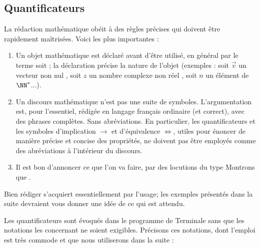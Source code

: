 \subsection{Quantificateurs}


La rédaction mathématique obéit à des règles précises qui doivent être rapidement maîtrisées. Voici les plus importantes : 
\begin{enumerate}
	\item Un objet mathématique est déclaré avant d’être utilisé, en général par le terme \og soit \fg ; la déclaration précise la nature de l’objet (exemples : \og soit $\overrightarrow{v}$ un vecteur non nul \fg, \og soit $z$ un nombre complexe non réel \fg, \og soit $n$ un  élément de $\NN^*$\fg ...).
	
	\item Un discours mathématique n’est pas une suite de symboles. L’argumentation est, pour l’essentiel, rédigée en langage français ordinaire (et correct), avec des phrases complètes. Sans abréviations. En particulier, les quantificateurs et les symboles d’implication $\rightarrow$ et d’équivalence $\Leftrightarrow$, utiles pour  énoncer de manière précise et concise des propriétés, ne doivent pas être employés comme des abréviations à l’intérieur du discours.
	
	\item Il est bon d’annoncer ce que l’on va faire, par des locutions du type \og Montrons que \fg.
\end{enumerate}

Bien rédiger s’acquiert essentiellement par l’usage; les exemples présentés dans la suite devraient vous donner une idée de ce qui est attendu.



Les quantificateurs sont évoqués dans le programme de Terminale sans que les notations les concernant ne soient exigibles. Précisons ces notations, dont l’emploi est très commode et que nous utiliserons dans la suite : 

